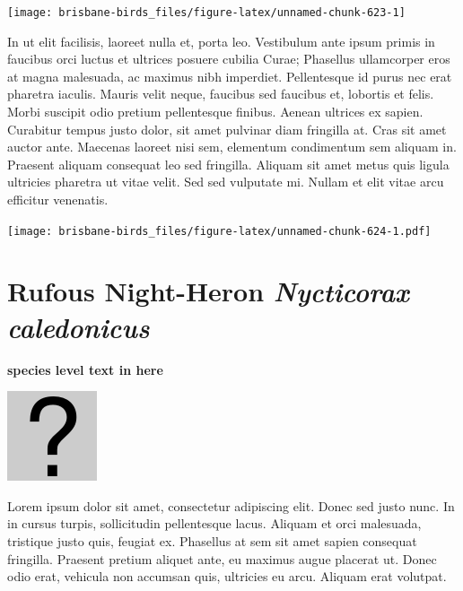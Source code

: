 \documentclass[]{book}
\let\origfigure\figure
\let\endorigfigure\endfigure
\renewenvironment{figure}[1][2] {
  \expandafter\origfigure\expandafter[H]
} {
  \endorigfigure
}
\begin{document}
\begin{figure}
\texttt{[image: brisbane-birds\_files/figure-latex/unnamed-chunk-623-1]} \caption{insert figure caption}\label{fig:unnamed-chunk-623}
\end{figure}

In ut elit facilisis, laoreet nulla et, porta leo. Vestibulum ante ipsum
primis in faucibus orci luctus et ultrices posuere cubilia Curae;
Phasellus ullamcorper eros at magna malesuada, ac maximus nibh
imperdiet. Pellentesque id purus nec erat pharetra iaculis. Mauris velit
neque, faucibus sed faucibus et, lobortis et felis. Morbi suscipit odio
pretium pellentesque finibus. Aenean ultrices ex sapien. Curabitur
tempus justo dolor, sit amet pulvinar diam fringilla at. Cras sit amet
auctor ante. Maecenas laoreet nisi sem, elementum condimentum sem
aliquam in. Praesent aliquam consequat leo sed fringilla. Aliquam sit
amet metus quis ligula ultricies pharetra ut vitae velit. Sed sed
vulputate mi. Nullam et elit vitae arcu efficitur venenatis.

\begin{figure}
\centering
\texttt{[image: brisbane-birds\_files/figure-latex/unnamed-chunk-624-1.pdf]}
\caption{\label{fig:unnamed-chunk-624}insert figure caption}
\end{figure}

\section{\texorpdfstring{Rufous Night-Heron \emph{Nycticorax
caledonicus}}{Rufous Night-Heron Nycticorax caledonicus}}\label{rufous-night-heron-nycticorax-caledonicus}

\textbf{species level text in here}

\begin{figure}
\centering
\includegraphics{assets/missing.png}
\caption{No image for species}
\end{figure}

Lorem ipsum dolor sit amet, consectetur adipiscing elit. Donec sed justo
nunc. In in cursus turpis, sollicitudin pellentesque lacus. Aliquam et
orci malesuada, tristique justo quis, feugiat ex. Phasellus at sem sit
amet sapien consequat fringilla. Praesent pretium aliquet ante, eu
maximus augue placerat ut. Donec odio erat, vehicula non accumsan quis,
ultricies eu arcu. Aliquam erat volutpat.
\end{document}
